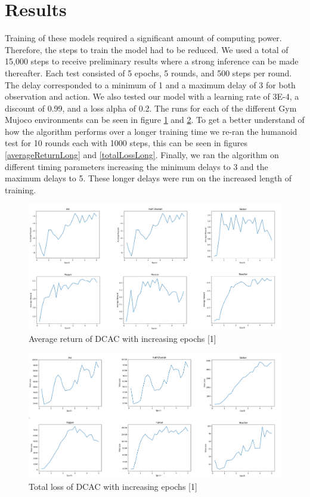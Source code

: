 \documentclass{article} %
\begin{document}
\section{Results}

Training of these models required a significant amount of computing power. 
Therefore, the steps to train the model had to be reduced. 
We used a total of 15,000 steps to receive preliminary results where a strong inference can be made thereafter. 
Each test consisted of 5 epochs, 5 rounds, and 500 steps per round. 
The delay corresponded to a minimum of 1 and a maximum delay of 3 for both observation and action. 
We also tested our model with a learning rate of 3E-4, a discount of 0.99, and a loss alpha of 0.2. 
The runs for each of the different Gym Mujoco environments can be seen in figure \ref{averageReturn} and \ref{totalLoss}.
To get a better understand of how the algorithm performs over a longer training time we re-ran the humanoid test for 10 rounds each with 1000 steps, this can be seen in figures \ref{averageReturnLong} and \ref{totalLossLong}.
Finally, we ran the algorithm on different timing parameters increasing the minimum delays to 3 and the maximum delays to 5.
These longer delays were run on the increased length of training.

\begin{figure}[H]
\begin{center}
\includegraphics[scale=0.8]{images/average_return.png}
\end{center}
\caption{Average return of DCAC with increasing epochs [1]}
\label{averageReturn}
\end{figure}

\begin{figure}[H]
\begin{center}
\includegraphics[scale=0.8]{images/total_loss.png}
\end{center}
\caption{Total loss of DCAC with increasing epochs [1]}
\label{totalLoss}
\end{figure}
\end{document}
